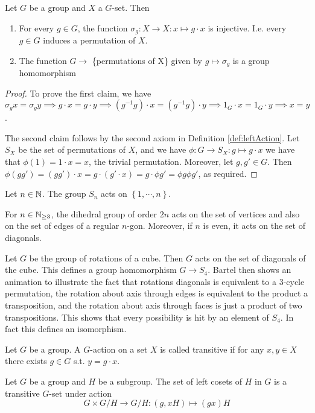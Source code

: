 \begin{theorem}
  Let $G$ be a group and $X$ a $G$-set. Then
  \begin{enumerate}
    \item For every $g\in G$, the function $\sigma_g:X\to X:x\mapsto g\cdot x$ is
      injective. I.e. every $g\in G$ induces a permutation of $X$.
    \item The function $G\to $ \{permutations of X\} given by $g\mapsto\sigma_g$ is a
      group homomorphism
  \end{enumerate}
  \label{<+label+>}
\end{theorem}
\begin{proof}
  To prove the first claim, we have $\sigma_g x = \sigma_g y \implies g\cdot x= g\cdot y
  \implies (g^{-1}g)\cdot x = (g^{-1}g)\cdot y \implies 1_G\cdot x = 1_G\cdot y \implies
  x=y$.
  
  The second claim follows by the second axiom in Definition \ref{def:leftAction}. Let
  $S_X$ be the set of permutations of $X$, and we have $\phi:G\to S_X: g\mapsto g\cdot x$
  we have that $\phi(1)=1\cdot x=x$, the trivial permutation. Moreover, let $g,g'\in G$.
  Then $\phi(gg') = (gg')\cdot x= g\cdot (g'\cdot x) = g\cdot \phi g' = \phi g \phi g'$,
  as required.
\end{proof}

\begin{example}
  Let $n\in\mathbb N$. The group $S_n$ acts on $\left\{ 1,\cdots, n \right\}$.

  For $n\in\mathbb N_{\geq 3}$, the dihedral group of order $2n$ acts on the set of vertices and
  also on the set of edges of a regular $n$-gon. Moreover, if $n$ is even, it acts on the
  set of diagonals.

  Let $G$ be the group of rotations of a cube. Then $G$ acts on the set of diagonals of
  the cube. This defines a group homomorphism $G\to S_4$. Bartel then shows an animation
  to illustrate the fact that rotations diagonals is equivalent to a $3$-cycle
  permutation, the rotation about axis through edges is equivalent to the product a
  transposition, and the rotation about axis through faces is just a product of two
  transpositions. This shows that every possibility is hit by an element of $S_4$. In fact
  this defines an isomorphism.
\end{example}

\begin{definition}
  Let $G$ be a group. A $G$-action on a set $X$ is called transitive if for any $x,y\in X$
  there exists $g\in G$ s.t. $y=g\cdot x$.
  \label{def:transitiveAction}
\end{definition}
\begin{example}
  Let $G$ be a group and $H$ be a subgroup. The set of left cosets of $H$ in $G$ is a
  transitive $G$-set under action
  \[G\times G/H \to G/H: (g,xH)\mapsto (gx)H\]
\end{example}

